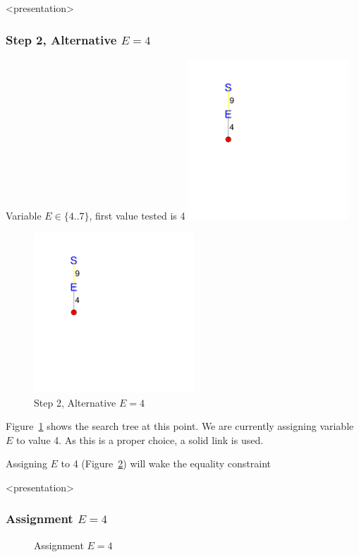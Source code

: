 \begin{frame}<presentation>
\frametitle{Step 2, Alternative $E=4$}
Variable $E\in \{4..7\}$, first value tested is 4
\includegraphics[width=6cm]{../sendmore/FULL/tree_expanded_3}
\end{frame}

\begin{figure}[ht]
\caption{\label{sendmore:Step 2, Alternative 1}Step 2, Alternative $E=4$}
\begin{center}
\includegraphics[width=6cm]{../sendmore/FULL/tree_expanded_3}
\end{center}
\end{figure}

Figure~\ref{sendmore:Step 2, Alternative 1} shows the search tree at this point. We are currently assigning variable $E$ to value 4. As this is a proper choice, a solid link is used.

Assigning $E$ to 4 (Figure~\ref{sendmore:assignmente4}) will wake the equality constraint


\begin{frame}<presentation>
\frametitle{Assignment $E=4$}
\begin{center}

\end{center}
\end{frame}

\begin{figure}[ht]
\caption{\label{sendmore:assignmente4}Assignment $E=4$}
\begin{center}

\end{center}
\end{figure}


